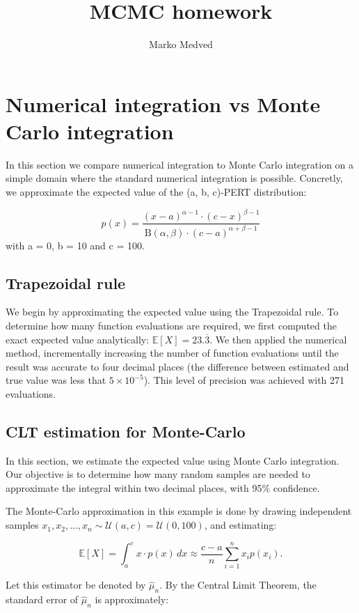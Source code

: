 \documentclass[9pt]{IEEEtran}
\title{\vspace{0ex}
MCMC homework}
\author{Marko Medved\vspace{-4.0ex}}
\begin{document}
\maketitle

 \section{Numerical integration vs Monte Carlo integration}
 In this section we compare numerical integration to Monte Carlo integration 
 on a simple domain where the standard numerical integration is possible. Concretly, we approximate 
 the expected value of the (a, b, c)-PERT distribution:

\[
p(x) = \frac{(x - a)^{\alpha - 1} \cdot (c - x)^{\beta - 1}}{\mathrm{B}(\alpha, \beta) \cdot (c - a)^{\alpha + \beta - 1}}
\]
 with a = 0, b = 10 and c = 100. 


 \subsection{Trapezoidal rule}
We begin by approximating the expected value using the Trapezoidal rule.
 To determine how many function evaluations are required, we first
  computed the exact expected value analytically: 
  $\mathbb{E}[X] = 23.\overline{3}$. We then applied the numerical method,
   incrementally increasing the number of function evaluations until the
    result was accurate to four decimal places (the difference between estimated 
    and true value was less that $5 \times 10^{-5}$). This level of precision was 
    achieved with 271 evaluations.

 \subsection{CLT estimation for Monte-Carlo}
In this section, we estimate the expected value using Monte Carlo integration.
 Our objective is to determine how many random samples are needed to approximate
  the integral within two decimal places, with 95\% confidence.
 
The Monte-Carlo approximation in this example is done by drawing
 independent samples
  \( x_1, x_2, \dots, x_n \sim \mathcal{U}(a, c) = \mathcal{U}(0, 100) \), and estimating:

\[
\mathbb{E}[X] = \int_a^c x \cdot p(x) \, dx \approx \frac{c - a}{n} \sum_{i=1}^n x_i p(x_i).
\]

Let this estimator be denoted by \( \hat{\mu}_n \). By the Central Limit Theorem, the standard error of \( \hat{\mu}_n \) is approximately:
\end{document}
